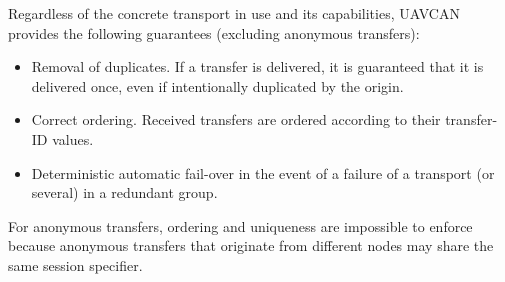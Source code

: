\begin{remark}
    Regardless of the concrete transport in use and its capabilities,
    UAVCAN provides the following guarantees (excluding anonymous transfers):

    \begin{itemize}
        \item Removal of duplicates. If a transfer is delivered, it is guaranteed that it is delivered once,
              even if intentionally duplicated by the origin.
        \item Correct ordering. Received transfers are ordered according to their transfer-ID values.
        \item Deterministic automatic fail-over in the event of a failure of a transport (or several)
              in a redundant group.
    \end{itemize}

    For anonymous transfers, ordering and uniqueness are impossible to enforce
    because anonymous transfers that originate from different nodes may share the same session specifier.
\end{remark}
